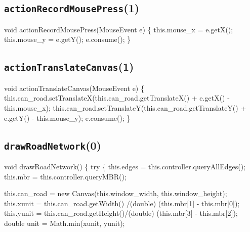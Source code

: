 \subsection{\texttt{actionRecordMousePress}(1)}
\nwenddocs{}\endmoddef{}
void actionRecordMousePress(MouseEvent e) \{
  this.mouse_x = e.getX();
  this.mouse_y = e.getY();
  e.consume();
\}
\eatline
{}\nwendcode{}\nwdocspar
\subsection{\texttt{actionTranslateCanvas}(1)}
\nwenddocs{}\endmoddef{}
void actionTranslateCanvas(MouseEvent e) \{
  this.can_road.setTranslateX(this.can_road.getTranslateX() + e.getX() - this.mouse_x);
  this.can_road.setTranslateY(this.can_road.getTranslateY() + e.getY() - this.mouse_y);
  e.consume();
\}
\eatline
{}\nwendcode{}\nwdocspar
\subsection{\texttt{drawRoadNetwork}(0)}
\nwenddocs{}\endmoddef{}
void drawRoadNetwork() \{
  try \{
    this.edges    = this.controller.queryAllEdges();
    this.mbr      = this.controller.queryMBR();

    this.can_road = new Canvas(this.window_width, this.window_height);
    this.xunit    = this.can_road.getWidth() /(double) (this.mbr[1] - this.mbr[0]);
    this.yunit    = this.can_road.getHeight()/(double) (this.mbr[3] - this.mbr[2]);
    double unit   = Math.min(xunit, yunit);

